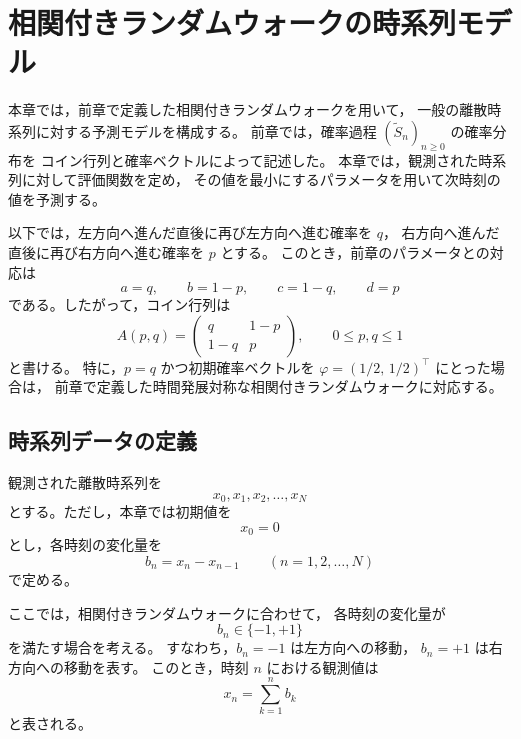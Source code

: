 \documentclass[a4j,dvipdfmx]{jsarticle}
\theoremstyle{plainnote}
\begin{document}
\newpage
\section{相関付きランダムウォークの時系列モデル}

本章では，前章で定義した相関付きランダムウォークを用いて，
一般の離散時系列に対する予測モデルを構成する。
前章では，確率過程 $(\tilde{S}_n)_{n\geq0}$ の確率分布を
コイン行列と確率ベクトルによって記述した。
本章では，観測された時系列に対して評価関数を定め，
その値を最小にするパラメータを用いて次時刻の値を予測する。

以下では，左方向へ進んだ直後に再び左方向へ進む確率を $q$，
右方向へ進んだ直後に再び右方向へ進む確率を $p$ とする。
このとき，前章のパラメータとの対応は
\[
  a=q,\qquad b=1-p,\qquad c=1-q,\qquad d=p
\]
である。したがって，コイン行列は
\begin{equation}
  A(p,q)
  =
  \begin{pmatrix}
    q & 1-p \\
    1-q & p
  \end{pmatrix},
  \qquad 0\leq p,q\leq 1
  \label{eq:A_pq_model}
\end{equation}
と書ける。
特に，$p=q$ かつ初期確率ベクトルを $\varphi=(1/2,\,1/2)^\top$ にとった場合は，
前章で定義した時間発展対称な相関付きランダムウォークに対応する。

\subsection{時系列データの定義}

観測された離散時系列を
\[
  x_0,x_1,x_2,\ldots,x_N
\]
とする。ただし，本章では初期値を
\begin{equation}
  x_0=0
  \label{eq:model_x0}
\end{equation}
とし，各時刻の変化量を
\begin{equation}
  b_n=x_n-x_{n-1}
  \qquad (n=1,2,\ldots,N)
  \label{eq:model_bn}
\end{equation}
で定める。

ここでは，相関付きランダムウォークに合わせて，
各時刻の変化量が
\begin{equation}
  b_n\in\{-1,+1\}
  \label{eq:model_bn_pm}
\end{equation}
を満たす場合を考える。
すなわち，$b_n=-1$ は左方向への移動，
$b_n=+1$ は右方向への移動を表す。
このとき，時刻 $n$ における観測値は
\begin{equation}
  x_n=\sum_{k=1}^{n} b_k
  \label{eq:model_xn}
\end{equation}
と表される。
\end{document}
